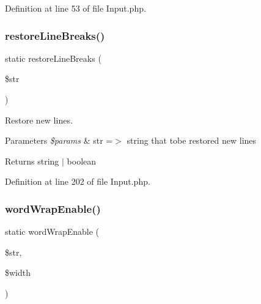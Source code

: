 Definition at line 53 of file Input.\+php.

\mbox{\label{class_zest_1_1_input_1_1_input_adb807f02238a7bceb0d65c3dcddffa2a}} 
\subsubsection{\texorpdfstring{restore\+Line\+Breaks()}{restoreLineBreaks()}}
{\footnotesize\ttfamily static restore\+Line\+Breaks (\begin{DoxyParamCaption}\item[{}]{\$str }\end{DoxyParamCaption})\hspace{0.3cm}{\ttfamily [static]}}

Restore new lines.


\begin{DoxyParams}{Parameters}
{\em \$params} & \textquotesingle{}str\textquotesingle{} =$>$ string that tobe restored new lines\\
\hline
\end{DoxyParams}
\begin{DoxyReturn}{Returns}
string $\vert$ boolean 
\end{DoxyReturn}


Definition at line 202 of file Input.\+php.

\mbox{\label{class_zest_1_1_input_1_1_input_a4083d5e802e6866eaf9bad44f01dffbb}} 
\subsubsection{\texorpdfstring{word\+Wrap\+Enable()}{wordWrapEnable()}}
{\footnotesize\ttfamily static word\+Wrap\+Enable (\begin{DoxyParamCaption}\item[{}]{\$str,  }\item[{}]{\$width }\end{DoxyParamCaption})\hspace{0.3cm}{\ttfamily [static]}}

